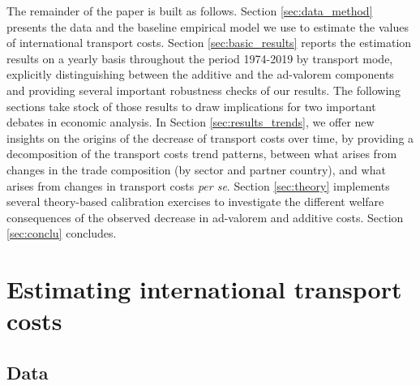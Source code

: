 \documentclass[a4paper,11pt]{article}
\begin{document}
The remainder of the paper is built as follows. Section \ref{sec:data_method} presents the data and the baseline empirical model we use to estimate the values of international transport costs. Section \ref{sec:basic_results} reports the estimation results on a yearly basis throughout the period 1974-2019 by transport mode, explicitly distinguishing between the additive and the ad-valorem components and providing several important robustness checks of our results. The following sections take stock of those results to draw implications for two important debates in economic analysis. In Section \ref{sec:results_trends}, we offer new insights on the origins of the decrease of transport costs over time, by providing a decomposition of the transport costs trend patterns, between what arises from changes in the trade composition (by sector and partner country), and what arises from changes in transport costs \textit{per se}. Section \ref{sec:theory} implements several theory-based calibration exercises to investigate the different welfare consequences of the observed decrease in ad-valorem and additive costs. Section \ref{sec:conclu} concludes.



\section{Estimating international transport costs\label{sec:data_method}}

\subsection{Data}
\end{document}
